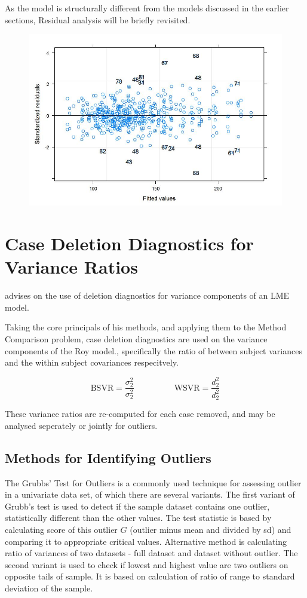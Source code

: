 \documentclass[12pt, a4paper]{report}
\theoremstyle{plain}
\theoremstyle{definition}
\theoremstyle{remark}
\begin{document}
As the model is structurally different from the models discussed in the earlier sections, Residual analysis will be briefly revisited.
\begin{figure}[h!]
	\centering
	\includegraphics[width=0.7\linewidth]{images/Residuals-JS-Roy}
	\caption{}
	\label{fig:Residuals-JS-Roy}
\end{figure}

\section{Case Deletion Diagnostics for Variance Ratios}

\citet{schabenberger} advises on the use of deletion diagnostics for variance components of an LME model.

Taking the core principals of his methods, and applying them to the Method Comparison problem, case deletion diagnostics are used on the variance components of the Roy model., specifically the ratio of between subject variances and the within subject covariances respecitvely.


\[ \mbox{BSVR} = \frac{\sigma^2_2}{\sigma^2_2} \phantom{makespace}  \mbox{WSVR} = \frac{d^2_2}{d^2_2} \]

These variance ratios are re-computed for each case removed, and may be analysed seperately or jointly for outliers. 

\subsection{Methods for Identifying Outliers}
The Grubbs' Test for Outliers is a commonly used technique for assessing outlier in a univariate data set, of which there are several variants. The first variant of Grubb's test is used to detect if the sample dataset contains one outlier, statistically different than
the other values. The test statistic is based by calculating score of this outlier $G$ (outlier minus mean and divided
by sd) and comparing it to appropriate critical values. Alternative method is calculating ratio of
variances of two datasets - full dataset and dataset without outlier. 
The second variant is used to check if lowest and highest value are two outliers on opposite tails of sample. It is based on calculation of ratio of range to standard deviation of the sample.
\end{document}
